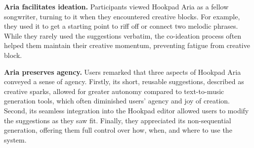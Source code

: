 \documentclass{article}
\newcommand\sysname{Hookpad Aria}
\begin{document}
\textbf{Aria facilitates ideation.} Participants viewed \sysname{} as a fellow songwriter, turning to it when they encountered creative blocks. For example, they used it to get a starting point to riff off or connect two melodic phrases. While they rarely used the suggestions verbatim, the co-ideation process often helped them maintain their creative momentum, preventing fatigue from creative block.


\textbf{Aria preserves agency.} 
Users remarked that three aspects of \sysname{} conveyed a sense of agency. 
Firstly, its short, reusable suggestions, described as creative sparks, allowed for greater autonomy compared to text-to-music generation tools, which often diminished users' agency and joy of creation.
Second, its seamless integration into the Hookpad editor allowed users to modify the suggestions as they saw fit. 
Finally, they appreciated its non-sequential generation, offering them full control over how, when, and where to use the system. 
\end{document}
